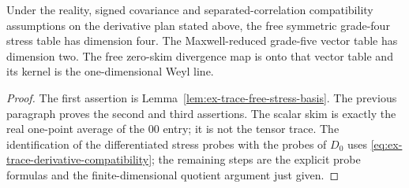 \begin{proposition}
\label{prop:ex-trace-free-closure-rank}
Under the reality, signed covariance and separated-correlation
compatibility assumptions on the derivative plan stated above, the free
symmetric grade-four stress table has dimension four. The Maxwell-reduced grade-five vector table has dimension two. The free
zero-skim divergence map is onto that vector table and its kernel is the
one-dimensional Weyl line.
\end{proposition}
\begin{proof}
The first assertion is Lemma~\ref{lem:ex-trace-free-stress-basis}. The
previous paragraph proves the second and third assertions. The scalar skim
is exactly the real one-point average of the $00$ entry; it is not the tensor
trace. The identification of the differentiated stress probes with the
probes of $D_0$ uses \eqref{eq:ex-trace-derivative-compatibility}; the
remaining steps are the explicit probe formulas and the finite-dimensional
quotient argument just given.
\end{proof}
